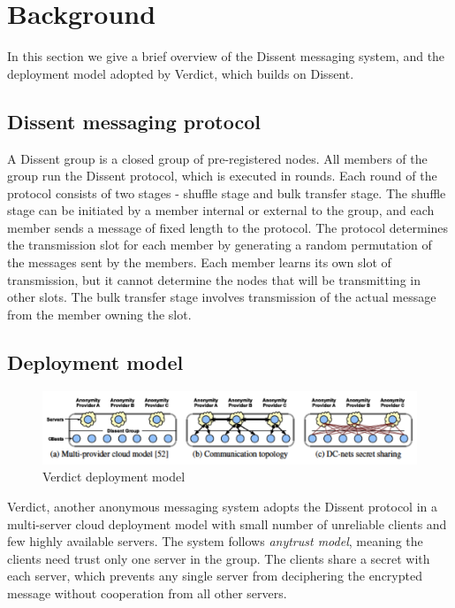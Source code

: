 \section{Background}
\label{sec:Background}
In this section we give a brief overview of the Dissent messaging system, and the deployment model adopted by Verdict, which builds on Dissent.

\subsection{Dissent messaging protocol}
A Dissent group is a closed group of pre-registered nodes. All members of the group run the Dissent protocol, which is executed in rounds. Each round of the protocol consists of two stages - shuffle stage and bulk transfer stage. The shuffle stage can be initiated by a member internal or external to the group, and each member sends a message of fixed length to the protocol. The protocol determines the transmission slot for each member by generating a random permutation of the messages sent by the members. Each member learns its own slot of transmission, but it cannot determine the nodes that will be transmitting in other slots. The bulk transfer stage involves transmission of the actual message from the member owning the slot. %

\subsection{Deployment model}
\begin{figure}
\centering
\includegraphics[width=0.7\linewidth]{dissent-model}
\caption{Verdict deployment model}
\label{fig:dissent-model}
\end{figure}

Verdict, another anonymous messaging system adopts the Dissent protocol in a multi-server cloud deployment model with small number of unreliable clients and few highly available servers. The system follows \emph{anytrust model}, meaning the clients need trust only one server in the group. The clients share a secret with each server, which prevents any single server from deciphering the encrypted message without cooperation from all other servers.

